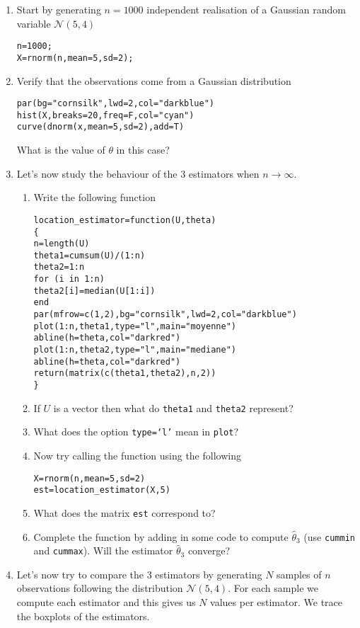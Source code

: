 \documentclass[a4paper,10pt]{article}
\begin{document}
\begin{enumerate} 
 \item Start by generating $n=1000$ independent realisation of a Gaussian random variable $\mathcal{N}(5,4)$
\begin{lstlisting}
n=1000;
X=rnorm(n,mean=5,sd=2);
\end{lstlisting} 

\item Verify that the observations come from a Gaussian distribution 
\begin{lstlisting}
par(bg="cornsilk",lwd=2,col="darkblue")
hist(X,breaks=20,freq=F,col="cyan")
curve(dnorm(x,mean=5,sd=2),add=T)
\end{lstlisting}
What is the value of $\theta$ in this case? 

\item Let's now study the behaviour of the 3 estimators when $n \rightarrow \infty$. 

\begin{enumerate}
\item Write the following function 
\begin{lstlisting}
location_estimator=function(U,theta)
{
n=length(U)
theta1=cumsum(U)/(1:n)
theta2=1:n
for (i in 1:n)
theta2[i]=median(U[1:i])
end
par(mfrow=c(1,2),bg="cornsilk",lwd=2,col="darkblue")
plot(1:n,theta1,type="l",main="moyenne")
abline(h=theta,col="darkred")
plot(1:n,theta2,type="l",main="mediane")
abline(h=theta,col="darkred")
return(matrix(c(theta1,theta2),n,2))
}
\end{lstlisting}
\item If $U$ is a vector then what do \texttt{theta1} and \texttt{theta2} represent? 
\item What does the option \texttt{type=`l'} mean in \texttt{plot}? 

\item Now try calling the function using the following 
\begin{lstlisting}
X=rnorm(n,mean=5,sd=2)
est=location_estimator(X,5)
\end{lstlisting}
\item What does the matrix \texttt{est} correspond to? 

\item Complete the function by adding in some code to compute $\hat{\theta}_3$ (use \texttt{cummin} and \texttt{cummax}). Will the estimator $\hat{\theta}_3$ converge? 
\end{enumerate}

\item Let's now try to compare the 3 estimators by generating $N$ samples of $n$ observations following the distribution $\mathcal{N}(5,4)$. For each sample we compute each estimator and this gives us $N$ values per estimator. We trace the boxplots of the estimators.  


\end{enumerate}
\end{document}
